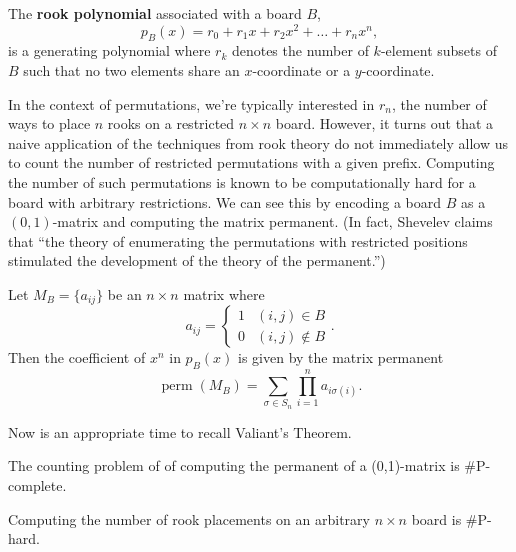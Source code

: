 \begin{definition}
  The \textbf{rook polynomial} associated with a board $B$,
  \begin{equation}
    p_B(x) = r_0 + r_1 x + r_2 x^2 + \dots + r_n x^n,
  \end{equation}
  is a generating polynomial where $r_k$ denotes the number of $k$-element subsets
  of $B$ such that no two elements share an $x$-coordinate or a $y$-coordinate.
\end{definition}

In the context of permutations, we're typically interested in $r_n$, the number
of ways to place $n$ rooks on a restricted $n \times n$ board.
However, it turns out that a naive application of the techniques from
rook theory do not immediately allow us to count the number of
restricted permutations with a given prefix.
Computing the number of such permutations is known to be computationally hard
for a board with arbitrary restrictions.
We can see this by encoding a board $B$ as a $(0,1)$-matrix and computing the matrix
permanent. (In fact, Shevelev \cite{Shevelev1992} claims that
``the theory of enumerating the permutations with restricted positions
stimulated the development of the theory of the permanent.'')

\begin{lemma}
  Let $M_B = \{a_{ij}\}$ be an $n \times n$ matrix where \begin{equation}
    a_{ij} = \begin{cases}
      1 & (i,j) \in B \\
      0 & (i,j) \not\in B
    \end{cases}.
  \end{equation}
  Then the coefficient of $x^n$ in $p_B(x)$ is given by the matrix permanent
  \begin{equation}
    \operatorname{perm}(M_B) = \sum_{\sigma \in S_n} \prod_{i=1}^n a_{i\sigma(i)}.
  \end{equation}
\end{lemma}

Now is an appropriate time to recall Valiant's Theorem.

\begin{theorem}
  The counting problem of of computing the permanent of a (0,1)-matrix is \#P-complete.
\end{theorem}

\begin{corollary}
  Computing the number of rook placements on an arbitrary $n \times n$ board is
  \#P-hard.
\end{corollary}

